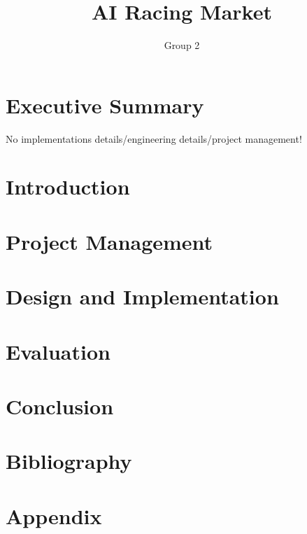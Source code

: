 \documentclass[11pt]{report}
\title{AI Racing Market}
\author{Group 2}
\begin{document}
\maketitle

\tableofcontents

\chapter{Executive Summary}
No implementations details/engineering details/project management!

\chapter{Introduction}


\chapter{Project Management}


\chapter{Design and Implementation}


\chapter{Evaluation}


\chapter{Conclusion}


\chapter{Bibliography}


\appendix
\chapter{Appendix}

\end{document}
